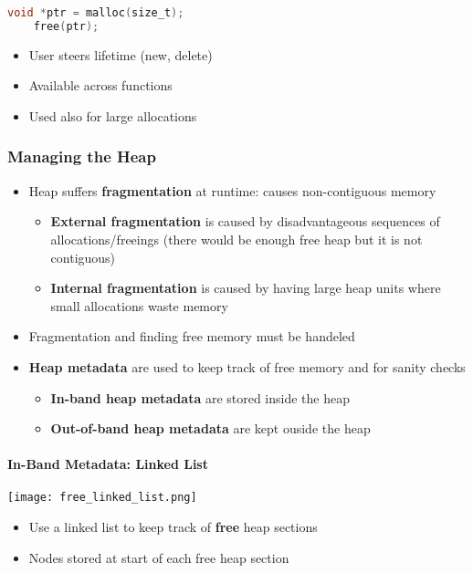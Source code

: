 \begin{lstlisting}[language={C}]
    void *ptr = malloc(size_t);
    free(ptr);                  
\end{lstlisting}
\begin{itemize}
    \item User steers lifetime (new, delete)
    \item Available across functions
    \item Used also for large allocations
\end{itemize}

\subsubsection{Managing the Heap}
\begin{itemize}
    \item Heap suffers \textbf{fragmentation} at runtime: causes non-contiguous memory
          \noindent\begin{itemize}
              \item \textbf{External fragmentation} is caused by disadvantageous sequences of allocations/freeings (there would be enough free heap but it is not contiguous)
              \item \textbf{Internal fragmentation} is caused by having large heap units where small allocations waste memory
          \end{itemize}
    \item Fragmentation and finding free memory must be handeled
    \item \textbf{Heap metadata} are used to keep track of free memory and for sanity checks
          \noindent\begin{itemize}
              \item \textbf{In-band heap metadata} are stored inside the heap
              \item \textbf{Out-of-band heap metadata} are kept ouside the heap
          \end{itemize}
\end{itemize}

\paragraph{In-Band Metadata: Linked List}
\texttt{[image: free\_linked\_list.png]}

\begin{itemize}
    \item Use a linked list to keep track of \textbf{free} heap sections
    \item Nodes stored at start of each free heap section
\end{itemize}

